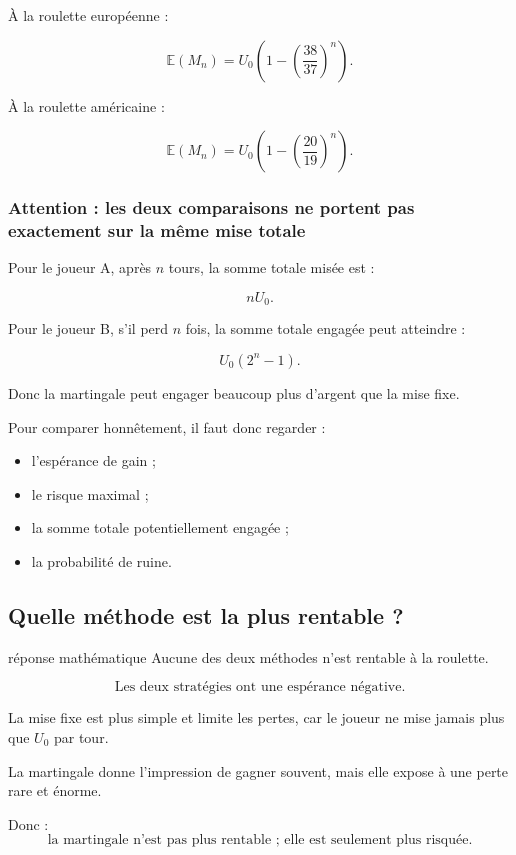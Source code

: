 \documentclass[11pt,a4paper]{article}
\begin{document}
À la roulette européenne :

\[
\mathbb{E}(M_n)
=
U_0\left(1-\left(\frac{38}{37}\right)^n\right).
\]

À la roulette américaine :

\[
\mathbb{E}(M_n)
=
U_0\left(1-\left(\frac{20}{19}\right)^n\right).
\]

\subsubsection*{Attention : les deux comparaisons ne portent pas exactement sur la même mise totale}

Pour le joueur A, après \(n\) tours, la somme totale misée est :

\[
nU_0.
\]

Pour le joueur B, s'il perd \(n\) fois, la somme totale engagée peut atteindre :

\[
U_0(2^n-1).
\]

Donc la martingale peut engager beaucoup plus d'argent que la mise fixe.

Pour comparer honnêtement, il faut donc regarder :
\begin{itemize}
    \item l'espérance de gain ;
    \item le risque maximal ;
    \item la somme totale potentiellement engagée ;
    \item la probabilité de ruine.
\end{itemize}

\subsection{Quelle méthode est la plus rentable ?}

\begin{conclusionbox}{réponse mathématique}
Aucune des deux méthodes n'est rentable à la roulette.

\[
\boxed{\text{Les deux stratégies ont une espérance négative.}}
\]

La mise fixe est plus simple et limite les pertes, car le joueur ne mise jamais plus que \(U_0\) par tour.

La martingale donne l'impression de gagner souvent, mais elle expose à une perte rare et énorme.

Donc :
\[
\boxed{\text{la martingale n'est pas plus rentable ; elle est seulement plus risquée.}}
\]
\end{conclusionbox}
\end{document}
